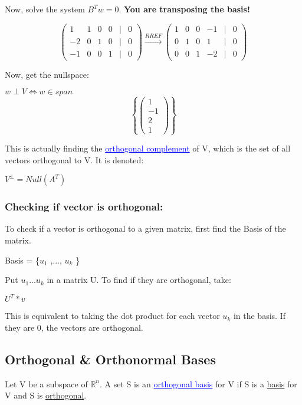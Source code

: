 \documentclass{article}
\newcommand{\bul}[1]{\textcolor{blue}{\underline{#1}}}
\begin{document}
Now, solve the system $B^Tw=0$. \textbf{You are transposing the basis!}
\begin{center}
    \[
    \begin{pmatrix}
        1 & 1 & 0 & 0 & \mid & 0\\
        -2 & 0 & 1 & 0 & \mid & 0\\
        -1 & 0 & 0 & 1 & \mid & 0
    \end{pmatrix}
    \xrightarrow{RREF}
    \begin{pmatrix}
        1 & 0 & 0 & -1 & \mid & 0 \\
        0 & 1 & 0 & 1 & \mid & 0 \\
        0 & 0 & 1 & -2 & \mid & 0 
    \end{pmatrix}
    \]
\end{center}

Now, get the nullspace:
\begin{center}
    $w \perp V \Leftrightarrow w \in span$\[\left\{
        \begin{pmatrix}
            1\\
            -1\\
            2\\
            1
        \end{pmatrix}
    \right\}\]
\end{center}

This is actually finding the \bul{orthogonal complement} of V, which is the set of all vectors orthogonal to V. It is denoted:
\begin{center}
    $V^\perp = Null(A^T)$
\end{center}

\subsubsection{Checking if vector is orthogonal:}
To check if a vector is orthogonal to a given matrix, first find the Basis of the matrix.
\begin{center}
    Basis = \{$u_1$ ,..., $u_k$ \}
\end{center}

Put $u_1...u_k$ in a matrix U. To find if they are orthogonal, take:
\begin{center}
    $U^T * v$
\end{center}
This is equivalent to taking the dot product for each vector $u_k$ in the basis. If they are 0, the vectors are orthogonal.

\subsection{Orthogonal \& Orthonormal Bases}
Let V be a subspace of $\mathbb{R}^n$. A set S is an \bul{orthogonal basis} for V if S is a \underline{basis} for V and S is \underline{orthogonal}.
\end{document}
